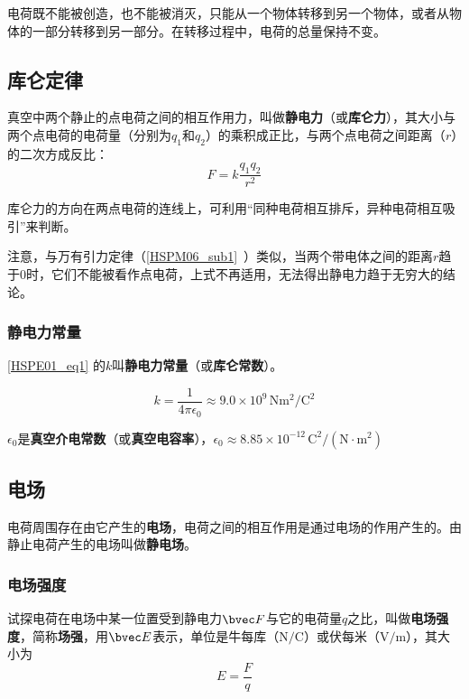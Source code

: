 电荷既不能被创造，也不能被消灭，只能从一个物体转移到另一个物体，或者从物体的一部分转移到另一部分。在转移过程中，电荷的总量保持不变。

\subsection{库仑定律}

真空中两个静止的点电荷之间的相互作用力，叫做\textbf{静电力}（或\textbf{库仑力}），其大小与两个点电荷的电荷量（分别为$q_1$和$q_2$）的乘积成正比，与两个点电荷之间距离（$r$）的二次方成反比：
\begin{equation}\label{HSPE01_eq1}
F=k \frac{q_1 q_2}{r^2}
\end{equation}

库仑力的方向在两点电荷的连线上，可利用“同种电荷相互排斥，异种电荷相互吸引”来判断。

注意，与万有引力定律（\autoref{HSPM06_sub1}~）类似，当两个带电体之间的距离$r$趋于$0$时，它们不能被看作点电荷，上式不再适用，无法得出静电力趋于无穷大的结论。

\subsubsection{静电力常量}

\autoref{HSPE01_eq1} 的$k$叫\textbf{静电力常量}（或\textbf{库仑常数}）。

\begin{equation}\label{HSPE01_eq8}
k = \frac{1}{4\pi\epsilon_0} \approx 9.0 \times 10^{9} \,\mathrm{N m^2/C^2}
\end{equation}

$\epsilon_0$是\textbf{真空介电常数}（或\textbf{真空电容率}），$\epsilon_0 \approx 8.85 \times 10^{-12}  \,\mathrm{C^2/(N \cdot m^2)}$

\subsection{电场}

电荷周围存在由它产生的\textbf{电场}，电荷之间的相互作用是通过电场的作用产生的。由静止电荷产生的电场叫做\textbf{静电场}。

\subsubsection{电场强度}

试探电荷在电场中某一位置受到静电力$\bvec F$与它的电荷量$q$之比，叫做\textbf{电场强度}，简称\textbf{场强}，用$\bvec E$表示，单位是牛每库（$\mathrm{N/C}$）或伏每米（$\mathrm{V/m}$），其大小为
\begin{equation}\label{HSPE01_eq2}
E =\frac {F}{q}
\end{equation}

